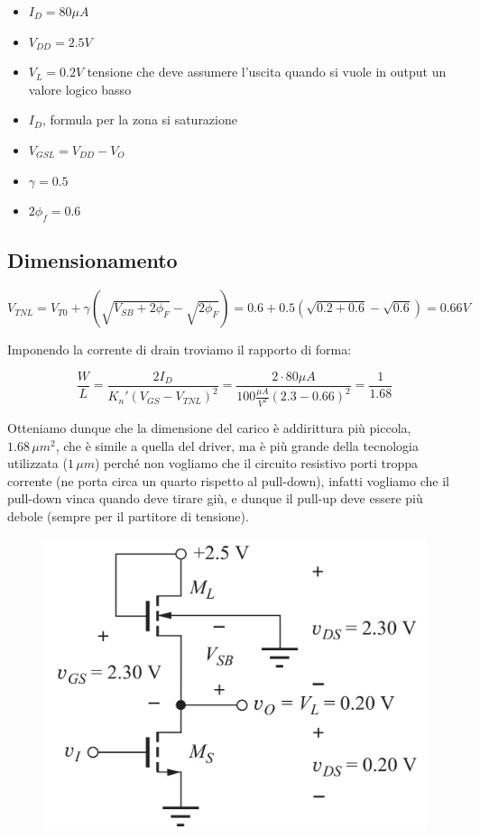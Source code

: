 \begin{itemize}
    \item $I_D = 80 \mu A$
    \item $V_{DD} = 2.5 V$
    \item $V_L = 0.2 V$ tensione che deve assumere l'uscita quando si vuole in output un valore logico basso
    \item $I_D$, formula per la zona si saturazione
    \item $V_{GSL} =V_{DD} - V_O$
    \item $\gamma = 0.5 $
    \item $2\phi_f = 0.6$
\end{itemize}

\subsection{Dimensionamento}

\begin{equation*}
    V_{TNL} = V_{T0} + \gamma(\sqrt{V_{SB} + 2\phi_F}  - \sqrt{2\phi_F}) = 0.6 + 0.5(\sqrt{0.2+0.6} - \sqrt{0.6}) = 0.66V
\end{equation*}

Imponendo la corrente di drain troviamo il rapporto di forma:

\begin{equation*}
    \frac{W}{L} = \frac{2I_D}{K_n'(V_{GS}  - V_{TNL})^2} = \frac{2\cdot80 \mu A}{100 \frac{\mu A}{V^2}(2.3-0.66)^2} = \frac{1}{1.68}
\end{equation*}

Otteniamo dunque che la dimensione del carico è addirittura più piccola, $1.68 \,\mu m^2$, che è simile a quella del driver, ma è più grande della tecnologia utilizzata ($1 \,\mu m$) perché non vogliamo che il circuito resistivo porti troppa corrente (ne porta circa un quarto rispetto al pull-down), infatti vogliamo che il pull-down vinca quando deve tirare giù, e dunque il pull-up deve essere più debole (sempre per il partitore di tensione).

\begin{figure}[htbp]
    \centering
    \includegraphics[width=0.4\linewidth]{img/pull_uppp.png}    
    
\end{figure}

